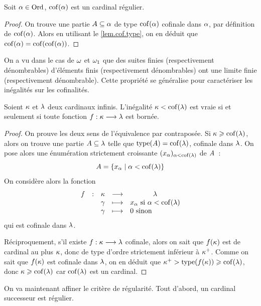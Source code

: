 \begin{property}
  Soit $\alpha\in\operatorname{Ord}$, $\operatorname{cof}(\alpha)$ est un cardinal régulier.
\end{property}

\begin{proof}
  On trouve une partie $A\subseteq\alpha$ de type $\operatorname{cof}(\alpha)$ cofinale
  dans $\alpha$, par définition de $\operatorname{cof}(\alpha)$. Alors en utilisant le
  \cref{lem.cof.type}, on en déduit que $\operatorname{cof}(\alpha) = \operatorname{cof}(\operatorname{cof}(\alpha))$.
\end{proof}

On a vu dans le cas de $\omega$ et $\omega_1$ que des suites finies
(respectivement dénombrables) d'éléments finis (respectivement dénombrables)
ont une limite finie (respectivement dénombrable). Cette propriété se généralise
pour caractériser les inégalités sur les cofinalités.

\begin{proposition}\label{prop.ineg.bounded}
  Soient $\kappa$ et $\lambda$ deux cardinaux infinis. L'inégalité
  $\kappa < \operatorname{cof}(\lambda)$ est vraie si et seulement si toute fonction
  $f : \displaystyle \kappa \longrightarrow \lambda$ est bornée.
\end{proposition}

\begin{proof}
  On prouve les deux sens de l'équivalence par contraposée.
  Si $\kappa \geqslant \operatorname{cof}(\lambda)$, alors on trouve une partie
  $A\subseteq\lambda$ telle que $\operatorname{type}(A)=\operatorname{cof}(\lambda)$, cofinale
  dans $\lambda$. On pose alors une énumération strictement croissante
  $(x_\alpha)_{\alpha < \operatorname{cof}(\lambda)}$ de $A$~:
  \[A = \left\{ x_\alpha \;\middle\vert\; \alpha < \operatorname{cof}(\lambda) \right\}\]
  On considère alors la fonction
  \[\makeFunBis{f}{\varCk}{\varCCl}
               {\varOc}{x_\varOa\text{ si } \varOa < \cof(\varCCl)}
               {\varOc}{0\text{ sinon }}
  \]
  qui est cofinale dans $\lambda$.

  Réciproquement, s'il existe $f : \displaystyle \kappa \longrightarrow \lambda$ cofinale, alors
  on sait que $f(\kappa)$ est de cardinal au plus $\kappa$, donc de type d'ordre
  strictement inférieur à $\kappa^{+}$. Comme on sait que $f(\kappa)$ est
  cofinale dans $\lambda$, on en déduit que
  $\kappa^{+} > \operatorname{type}(f(\kappa)) \geqslant \operatorname{cof}(\lambda)$, donc
  $\kappa \geqslant \operatorname{cof}(\lambda)$ car $\operatorname{cof}(\lambda)$ est un cardinal.
\end{proof}

On va maintenant affiner le critère de régularité. Tout d'abord, un cardinal
successeur est régulier.

